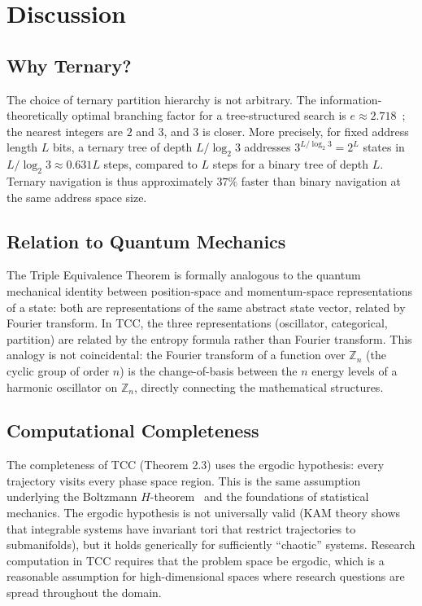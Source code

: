 \documentclass[12pt,twocolumn]{article}
\begin{document}
\section{Discussion}
\label{sec:discussion}

\subsection{Why Ternary?}

The choice of ternary partition hierarchy is not arbitrary. The information-theoretically optimal branching factor for a tree-structured search is $e \approx 2.718$~\cite{cover2006elements}; the nearest integers are $2$ and $3$, and $3$ is closer. More precisely, for fixed address length $L$ bits, a ternary tree of depth $L/\log_2 3$ addresses $3^{L/\log_2 3} = 2^L$ states in $L/\log_2 3 \approx 0.631L$ steps, compared to $L$ steps for a binary tree of depth $L$. Ternary navigation is thus approximately $37\%$ faster than binary navigation at the same address space size.

\subsection{Relation to Quantum Mechanics}

The Triple Equivalence Theorem is formally analogous to the quantum mechanical identity between position-space and momentum-space representations of a state: both are representations of the same abstract state vector, related by Fourier transform. In TCC, the three representations (oscillator, categorical, partition) are related by the entropy formula rather than Fourier transform. This analogy is not coincidental: the Fourier transform of a function over $\mathbb{Z}_n$ (the cyclic group of order $n$) is the change-of-basis between the $n$ energy levels of a harmonic oscillator on $\mathbb{Z}_n$, directly connecting the mathematical structures.

\subsection{Computational Completeness}

The completeness of TCC (Theorem 2.3) uses the ergodic hypothesis: every trajectory visits every phase space region. This is the same assumption underlying the Boltzmann $H$-theorem~\cite{boltzmann1896vorlesungen} and the foundations of statistical mechanics. The ergodic hypothesis is not universally valid (KAM theory shows that integrable systems have invariant tori that restrict trajectories to submanifolds), but it holds generically for sufficiently ``chaotic'' systems. Research computation in TCC requires that the problem space be ergodic, which is a reasonable assumption for high-dimensional spaces where research questions are spread throughout the domain.
\end{document}
